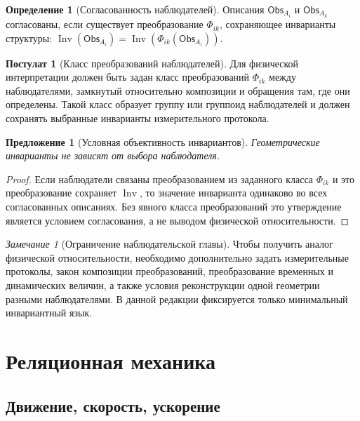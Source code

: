 \documentclass[12pt,a4paper,oneside]{book}
\theoremstyle{definition}
\newtheorem{definition}{Определение}[chapter]
\newtheorem{postulate}{Постулат}[chapter]
\theoremstyle{plain}
\newtheorem{proposition}{Предложение}[chapter]
\theoremstyle{remark}
\newtheorem{remark}{Замечание}[chapter]
\newcommand{\Observer}{\mathsf{Obs}}
\newcommand{\Inv}{\operatorname{Inv}}
\begin{document}
\begin{definition}[Согласованность наблюдателей]
Описания $\Observer_{A_i}$ и $\Observer_{A_k}$ согласованы, если существует
преобразование $\Phi_{ik}$, сохраняющее инварианты структуры:
$\Inv(\Observer_{A_i})=\Inv(\Phi_{ik}(\Observer_{A_i}))$.
\end{definition}

\begin{postulate}[Класс преобразований наблюдателей]
Для физической интерпретации должен быть задан класс преобразований
$\Phi_{ik}$ между наблюдателями, замкнутый относительно композиции и обращения там,
где они определены. Такой класс образует группу или группоид наблюдателей и должен
сохранять выбранные инварианты измерительного протокола.
\end{postulate}

\begin{proposition}[Условная объективность инвариантов]
Геометрические инварианты не зависят от выбора наблюдателя.
\end{proposition}

\begin{proof}
Если наблюдатели связаны преобразованием из заданного класса $\Phi_{ik}$ и это
преобразование сохраняет $\Inv$, то значение инварианта одинаково во всех
согласованных описаниях. Без явного класса преобразований это утверждение является
условием согласования, а не выводом физической относительности.
\end{proof}

\begin{remark}[Ограничение наблюдательской главы]
Чтобы получить аналог физической относительности, необходимо дополнительно задать
измерительные протоколы, закон композиции преобразований, преобразование временных и
динамических величин, а также условия реконструкции одной геометрии разными
наблюдателями. В данной редакции фиксируется только минимальный инвариантный язык.
\end{remark}

\chapter{Реляционная механика}

\section{Движение, скорость, ускорение}
\end{document}
